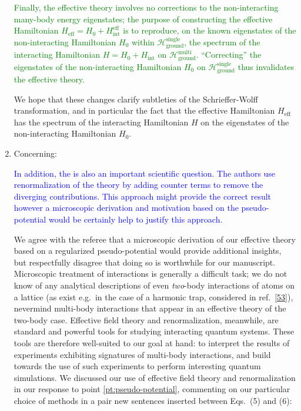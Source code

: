 \documentclass[preprint]{revtex4-1}
\renewcommand{\t}{\text} %
\renewcommand{\H}{\mathcal{H}}
\newcommand{\1}{\mathds{1}}
\newcommand{\blue}[1]{\textcolor{blue}{#1}}
\newcommand{\green}[1]{\textcolor{green}{#1}}
\begin{document}
\begin{enumerate}
  \green{Finally, the effective theory involves no corrections to the
    non-interacting many-body energy eigenstates; the purpose of
    constructing the effective Hamiltonian
    $H_{\t{eff}} = H_0 + H_{\t{int}}^{\t{eff}}$ is to reproduce, on
    the known eigenstates of the non-interacting Hamiltonian $H_0$
    within $\H_{\t{ground}}^{\t{single}}$, the spectrum of the
    interacting Hamiltonian $H = H_0 + H_{\t{int}}$ on
    $\H_{\t{ground}}^{\t{multi}}$.  ``Correcting'' the eigenstates of
    the non-interacting Hamiltonian $H_0$ on
    $\H_{\t{ground}}^{\t{single}}$ thus invalidates the effective
    theory.}

  We hope that these changes clarify subtleties of the
  Schrieffer-Wolff transformation, and in particular the fact that the
  effective Hamiltonian $H_{\t{eff}}$ has the spectrum of the
  interacting Hamiltonian $H$ on the eigenstates of the
  non-interacting Hamiltonian $H_0$.


\item Concerning:

  \blue{In addition, the is also an important scientific question. The
    authors use renormalization of the theory by adding counter terms
    to remove the diverging contributions. This approach might provide
    the correct result however a microscopic derivation and motivation
    based on the pseudo-potential would be certainly help to justify
    this approach.}

  We agree with the referee that a microscopic derivation of our
  effective theory based on a regularized pseudo-potential would
  provide additional insights, but respectfully disagree that doing so
  is worthwhile for our manuscript.  Microscopic treatment of
  interactions is generally a difficult task; we do not know of any
  analytical descriptions of even {\it two}-body interactions of atoms
  on a lattice (as exist e.g.~in the case of a harmonic trap,
  considered in
  ref.~[\href{https://link.springer.com/article/10.1023\%2FA\%3A1018705520999}{53}]),
  nevermind multi-body interactions that appear in an effective theory
  of the two-body case.  Effective field theory and renormalization,
  meanwhile, are standard and powerful tools for studying interacting
  quantum systems.  These tools are therefore well-suited to our goal
  at hand: to interpret the results of experiments exhibiting
  signatures of multi-body interactions, and build towards the use of
  such experiments to perform interesting quantum simulations.  We
  discussed our use of effective field theory and renormalization in
  our response to point \ref{pt:pseudo-potential}, commenting on our
  particular choice of methods in a pair new sentences inserted
  between Eqs.~(5) and (6):


\end{enumerate}
\end{document}
